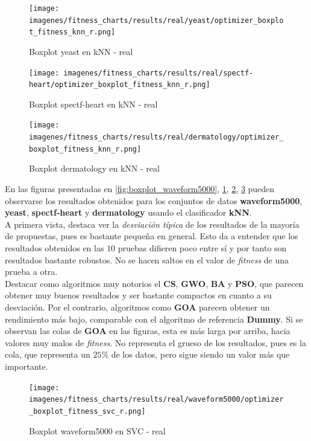 \begin{figure}[htp]
    \centering
    \texttt{[image: imagenes/fitness\_charts/results/real/yeast/optimizer\_boxplot\_fitness\_knn\_r.png]}
    \caption{Boxplot yeast en kNN - real}
    \label{fig:boxplot_yeast}
\end{figure}

\begin{figure}[htp]
    \centering
    \texttt{[image: imagenes/fitness\_charts/results/real/spectf-heart/optimizer\_boxplot\_fitness\_knn\_r.png]}
    \caption{Boxplot spectf-heart en kNN - real}
    \label{fig:boxplot_spectf-heart}
\end{figure}

\begin{figure}[htp]
    \centering
    \texttt{[image: imagenes/fitness\_charts/results/real/dermatology/optimizer\_boxplot\_fitness\_knn\_r.png]}
    \caption{Boxplot dermatology en kNN - real}
    \label{fig:boxplot_dermatology}
\end{figure}

En las figuras presentadas en \ref{fig:boxplot_waveform5000}, \ref{fig:boxplot_yeast}, \ref{fig:boxplot_spectf-heart}, \ref{fig:boxplot_dermatology} pueden observarse los resultados obtenidos para los conjuntos de datos \textbf{waveform5000}, \textbf{yeast}, \textbf{spectf-heart} y \textbf{dermatology} usando el clasificador \textbf{kNN}. \\[6pt]
A primera vista, destaca ver la \textit{desviación típica} de los resultados de la mayoría de propuestas, pues es bastante pequeña en general. Esto da a entender que los resultados obtenidos en las $10$ pruebas difieren poco entre sí y por tanto son resultados bastante robustos. No se hacen saltos en el valor de \textit{fitness} de una prueba a otra.\\[6pt]
Destacar como algoritmos muy notorios el \textbf{CS}, \textbf{GWO}, \textbf{BA} y \textbf{PSO}, que parecen obtener muy buenos resultados y ser bastante compactos en cuanto a su desviación. Por el contrario, algoritmos como \textbf{GOA} parecen obtener un rendimiento más bajo, comparable con el algoritmo de referencia \textbf{Dummy}. Si se observan las colas de \textbf{GOA} en las figuras, esta es más larga por arriba, hacia valores muy malos de \textit{fitness}. No representa el grueso de los resultados, pues es la cola, que representa un $25\%$ de los datos, pero sigue siendo un valor más que importante.\\[6pt]

\begin{figure}[htp]
    \centering
    \texttt{[image: imagenes/fitness\_charts/results/real/waveform5000/optimizer\_boxplot\_fitness\_svc\_r.png]}
    \caption{Boxplot waveform5000 en SVC - real}
    \label{fig:boxplot_waveform5000svc}
\end{figure}

